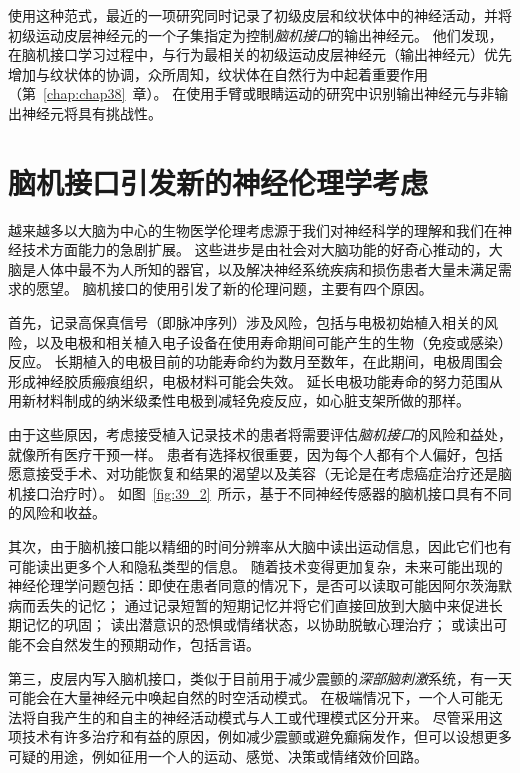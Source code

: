 使用这种范式，最近的一项研究同时记录了初级皮层和纹状体中的神经活动，并将初级运动皮层神经元的一个子集指定为控制\textit{脑机接口}的输出神经元。
他们发现，在脑机接口学习过程中，与行为最相关的初级运动皮层神经元（输出神经元）优先增加与纹状体的协调，众所周知，纹状体在自然行为中起着重要作用（第~\ref{chap:chap38}~章）。
在使用手臂或眼睛运动的研究中识别输出神经元与非输出神经元将具有挑战性。



\section{脑机接口引发新的神经伦理学考虑}

越来越多以大脑为中心的生物医学伦理考虑源于我们对神经科学的理解和我们在神经技术方面能力的急剧扩展。
这些进步是由社会对大脑功能的好奇心推动的，大脑是人体中最不为人所知的器官，以及解决神经系统疾病和损伤患者大量未满足需求的愿望。
脑机接口的使用引发了新的伦理问题，主要有四个原因。


首先，记录高保真信号（即脉冲序列）涉及风险，包括与电极初始植入相关的风险，以及电极和相关植入电子设备在使用寿命期间可能产生的生物（免疫或感染）反应。
长期植入的电极目前的功能寿命约为数月至数年，在此期间，电极周围会形成神经胶质瘢痕组织，电极材料可能会失效。
延长电极功能寿命的努力范围从用新材料制成的纳米级柔性电极到减轻免疫反应，如心脏支架所做的那样。


由于这些原因，考虑接受植入记录技术的患者将需要评估\textit{脑机接口}的风险和益处，就像所有医疗干预一样。
患者有选择权很重要，因为每个人都有个人偏好，包括愿意接受手术、对功能恢复和结果的渴望以及美容（无论是在考虑癌症治疗还是脑机接口治疗时）。
如图~\ref{fig:39_2}~所示，基于不同神经传感器的脑机接口具有不同的风险和收益。


其次，由于脑机接口能以精细的时间分辨率从大脑中读出运动信息，因此它们也有可能读出更多个人和隐私类型的信息。
随着技术变得更加复杂，未来可能出现的神经伦理学问题包括：即使在患者同意的情况下，是否可以读取可能因阿尔茨海默病而丢失的记忆；
通过记录短暂的短期记忆并将它们直接回放到大脑中来促进长期记忆的巩固；
读出潜意识的恐惧或情绪状态，以协助脱敏心理治疗；
或读出可能不会自然发生的预期动作，包括言语。


第三，皮层内写入脑机接口，类似于目前用于减少震颤的\textit{深部脑刺激}系统，有一天可能会在大量神经元中唤起自然的时空活动模式。
在极端情况下，一个人可能无法将自我产生的和自主的神经活动模式与人工或代理模式区分开来。
尽管采用这项技术有许多治疗和有益的原因，例如减少震颤或避免癫痫发作，但可以设想更多可疑的用途，例如征用一个人的运动、感觉、决策或情绪效价回路。


